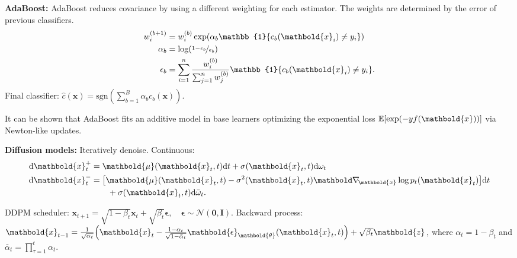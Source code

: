 \documentclass[9pt]{extarticle}
\newenvironment{topic}[1]
{\textbf{\sffamily \colorbox{black}{\rlap{\textbf{\textcolor{white}{#1}}}\hspace{\linewidth}\hspace{-2\fboxsep}}}}
{}
\newenvironment{subtopic}[1]
{\textbf{\sffamily #1:}}
{}
\renewcommand{\mat}[1]{\ensuremath{\mathbf{#1}}}
\renewcommand{\vec}[1]{\ensuremath{\mathbold{#1}}}
\begin{document}
\begin{multicols*}{3}
\begin{topic}{Ensembles}
        \begin{subtopic}{AdaBoost}
            AdaBoost reduces covariance by using a different weighting for each estimator. The weights are
            determined by the error of previous classifiers.
            \begin{align*}
                w_i^{(b+1)} & = w_i^{(b)} \exp(\alpha_b \mathbb{1}\{ c_b(\vec{x}_i) \neq y_i \})                                   \\
                \alpha_b    & = \log \lft( \nicefrac{1-\epsilon_b}{\epsilon_b} \rgt)                                               \\
                \epsilon_b  & = \sum_{i=1}^{n} \frac{w_i^{(b)}}{\sum_{j=1}^{n} w_j^{(b)}} \mathbb{1}\{ c_b(\vec{x}_i) \neq y_i \}.
            \end{align*}
            Final classifier: $\hat{c}(\vec{x}) = \mathrm{sgn}(\sum_{b=1}^{B} \alpha_b c_b(\vec{x}))$.

            It can be shown that AdaBoost fits an additive model in base learners optimizing the exponential
            loss $\E[\exp(-yf(\vec{x}))]$ via Newton-like updates.

        \end{subtopic}

    \end{topic}

    \begin{topic}{Stable diffusion}

        \begin{subtopic}{Diffusion models}
            Iteratively denoise. Continuous:
            \begin{align*}
                \mathrm{d}\vec{x}^+_t & = \vec{\mu}(\vec{x}_t, t) \mathrm{d}t + \sigma(\vec{x}_t, t) \mathrm{d}\omega_t                                \\
                \mathrm{d}\vec{x}^-_t & = \lft[ \vec{\mu}(\vec{x}_t, t) - \sigma^2(\vec{x}_t, t) \grad{\log p_t(\vec{x}_t)}{\vec{x}} \rgt] \mathrm{d}t \\
                                      & \quad \quad + \sigma(\vec{x}_t, t) \mathrm{d}\bar{\omega}_t.
            \end{align*}

            DDPM scheduler: $\vec{x}_{t+1} = \sqrt{1-\beta_t} \vec{x}_t + \sqrt{\beta_t} \vec{\epsilon}, \quad
                \vec{\epsilon} \sim \mathcal{N}(\vec{0}, \mat{I})$. Backward process: $\vec{x}_{t-1} =
                \frac{1}{\sqrt{\alpha_t}} \lft( \vec{x}_t - \frac{1-\alpha_t}{\sqrt{1-\bar{\alpha}_t}}
                \vec{\epsilon}_{\vec{\theta}}(\vec{x}_t, t) \rgt) + \sqrt{\beta_t} \vec{z}$, where $\alpha_t =
                1-\beta_t$ and $\bar{\alpha}_t = \prod_{\tau=1}^t \alpha_t$.


\end{subtopic}
\end{topic}
\end{multicols*}
\end{document}
